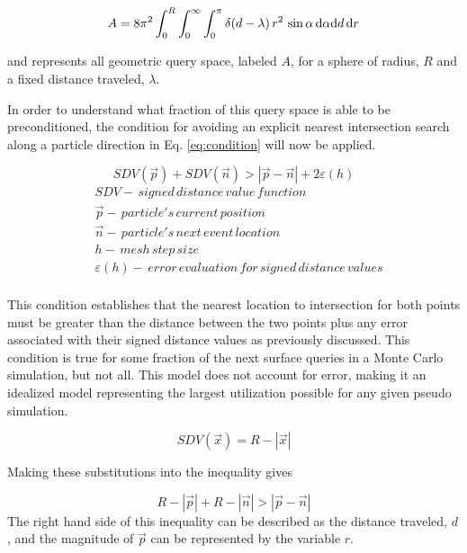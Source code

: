 \begin{equation}
  \label{eq:A_fixed}
\small A = 8\pi^2  \int_{0}^{R}\int_{0}^{\infty}\int_{0}^{\pi} \delta(d-\lambda) \,
r^2 \, \sin{\alpha} \, \mathrm{d}\alpha \mathrm{d}d \, \mathrm{d}r
\end{equation}

and represents all geometric query space, labeled $A$, for a sphere of radius,
$R$ and a fixed distance traveled, $\lambda$.

In order to understand what fraction of this query space is able to be
preconditioned, the condition for avoiding an explicit nearest intersection
search along a particle direction in Eq. \ref{eq:condition} will now be
applied.

\begin{equation}
  SDV(\vec{p}) + SDV(\vec{n}) > |\vec{p}-\vec{n}| + 2\varepsilon(h)
  \label{eq:condition}
\end{equation}
\begin{align*}
 &SDV - \, signed \, distance \, value \, function \\
 &\vec{p} - \, particle's \, current \, position \\
 &\vec{n} - \, particle's \, next \, event \, location \\
 &h - \, mesh \, step \, size \\
 &\varepsilon(h) - \, error \, evaluation \, for \, signed \, distance \, values \\
\end{align*}

This condition establishes that the nearest location to intersection for both
points must be greater than the distance between the two points plus any error
associated with their signed distance values as previously discussed. This
condition is true for some fraction of the next surface queries in a Monte Carlo
simulation, but not all.  This model does not account for error, making it an
idealized model representing the largest utilization possible for any given
pseudo simulation.

\begin{equation}
SDV(\vec{x}) =  R-|\vec{x}|
\end{equation}

Making these substitutions into the inequality gives

\begin{equation}
R-|\vec{p}| + R - |\vec{n}| >   |\vec{p}-\vec{n}|
\end{equation}
The right hand side of this inequality can be described as the distance
traveled, $d$, and the magnitude of $\vec{p}$ can be represented
by the variable $r$.

